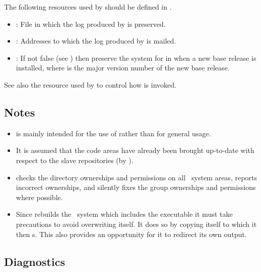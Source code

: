 \noindent
The following resources used by  should be defined in
.

\begin{itemize}
\item
   : File in which the log produced by
    is preserved.

\item
   : Addresses to which the log produced
   by  is mailed.

\item
   : If not false (see ) then
   preserve the system for  in 
   when a new base release is installed, where  is the major version
   number of the new base release.
\end{itemize}

See also the  resource used by  to
control how  is invoked.

\subsection*{Notes}

\begin{itemize}
\item
    is mainly intended for the use of  rather than
   for general usage.

\item
   It is assumed that the code areas have already been brought up-to-date with
   respect to the slave repositories (by ).

\item
    checks the directory ownerships and permissions on all
   \aipspp\ system areas, reports incorrect ownerships, and silently fixes the
   group ownerships and permissions where possible.

\item
   Since  rebuilds the \aipspp\ system which includes the
    executable it must take precautions to avoid overwriting
   itself.  It does so by copying itself to  which it then
   s.  This also provides an opportunity for it to redirect its
   own output.
\end{itemize}

\subsection*{Diagnostics}

